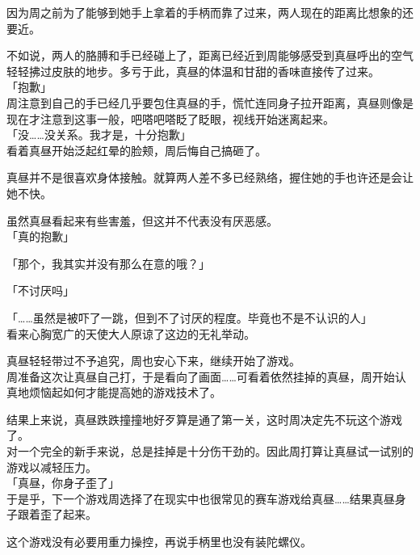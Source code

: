 因为周之前为了能够到她手上拿着的手柄而靠了过来，两人现在的距离比想象的还要近。

不如说，两人的胳膊和手已经碰上了，距离已经近到周能够感受到真昼呼出的空气轻轻拂过皮肤的地步。多亏于此，真昼的体温和甘甜的香味直接传了过来。\\

「抱歉」\\

周注意到自己的手已经几乎要包住真昼的手，慌忙连同身子拉开距离，真昼则像是现在才注意到这事一般，吧嗒吧嗒眨了眨眼，视线开始迷离起来。\\

「没……没关系。我才是，十分抱歉」\\

看着真昼开始泛起红晕的脸颊，周后悔自己搞砸了。

真昼并不是很喜欢身体接触。就算两人差不多已经熟络，握住她的手也许还是会让她不快。

虽然真昼看起来有些害羞，但这并不代表没有厌恶感。\\

「真的抱歉」

「那个，我其实并没有那么在意的哦？」

「不讨厌吗」

「……虽然是被吓了一跳，但到不了讨厌的程度。毕竟也不是不认识的人」\\

看来心胸宽广的天使大人原谅了这边的无礼举动。

真昼轻轻带过不予追究，周也安心下来，继续开始了游戏。\\

周准备这次让真昼自己打，于是看向了画面……可看着依然挂掉的真昼，周开始认真地烦恼起如何才能提高她的游戏技术了。\\

\vspace{2\baselineskip}

结果上来说，真昼跌跌撞撞地好歹算是通了第一关，这时周决定先不玩这个游戏了。\\

对一个完全的新手来说，总是挂掉是十分伤干劲的。因此周打算让真昼试一试别的游戏以减轻压力。\\

「真昼，你身子歪了」\\

于是乎，下一个游戏周选择了在现实中也很常见的赛车游戏给真昼……结果真昼身子跟着歪了起来。

这个游戏没有必要用重力操控，再说手柄里也没有装陀螺仪。\\

